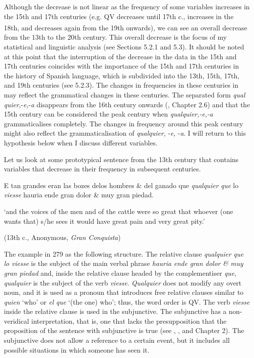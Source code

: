 \documentclass[output=paper]{langscibook}
\begin{document}
Although the decrease is not linear as the frequency of some variables increases in the 15th and 17th centuries (e.g. QV decreases until 17th c., increases in the 18th, and decreases again from the 19th\textsuperscript{} onwards), we can see an overall decrease from the 13th to the 20th century. This overall decrease is the focus of my statistical and linguistic analysis (see Sections 5.2.1 and 5.3). It should be noted at this point that the interruption of the decrease in the data in the 15th and 17th centuries coincides with the importance of the 15th and 17th centuries in the history of Spanish language, which is subdivided into the 13th, 15th, 17th, and 19th centuries (see 5.2.3). The changes in frequencies in these centuries in  may reflect the grammatical changes in these centuries. The separated form \textit{qual quier,}\nobreakdash-\textit{e,}\nobreakdash-\textit{a} disappears from the 16th century onwards (\citealt{Pato2012}, Chapter 2.6) and that the 15th century can be considered the peak century when \textit{qualquier,-e,-a} grammaticalises completely. The changes in frequency around this peak century might also reflect the grammaticalisation of \textit{qualquier,} \nobreakdash-\textit{e,} \nobreakdash-\textit{a}. I will return to this hypothesis below when I discuss different variables.

  Let us look at some prototypical sentence from the 13th century that contains variables that decrease in their frequency in subsequent centuries. 

  E tan grandes eran las bozes delos hombres \& del ganado que \textit{qualquier que} lo \textit{viesse} hauria ende gran dolor \& muy gran piedad. 

  ‘and the voices of the men and of the cattle were so great that whoever (one wants that) s/he sees it would have great pain and very great pity.’

  (13th c., Anonymous, \textit{Gran Conquista})

The example in 279 as the following structure. The relative clause \textit{qualquier que} \textit{lo viesse} is the subject of the main verbal phrase \textit{hauria ende gran dolor \& muy gran piedad} and, inside the relative clause headed by the complementiser \textit{que}, \textit{qualquier} is the subject of the verb \textit{viesse}. \textit{Qualquier} does not modify any overt noun, and it is used as a pronoun that introduces free relative clauses similar to \textit{quien} ‘who’ or \textit{el que} ‘(the one) who’; thus, the word order is QV. The verb \textit{viesse} inside the relative clause is used in the subjunctive. The subjunctive has a non-veridical interpretation, that is, one that lacks the presupposition that the proposition of the sentence with subjunctive is true (see \citealt{Quer1998,Quer2000}, \citealt{Becker2014}, and Chapter 2). The subjunctive does not allow a reference to a certain event, but it includes all possible situations in which someone has seen it.
\end{document}
